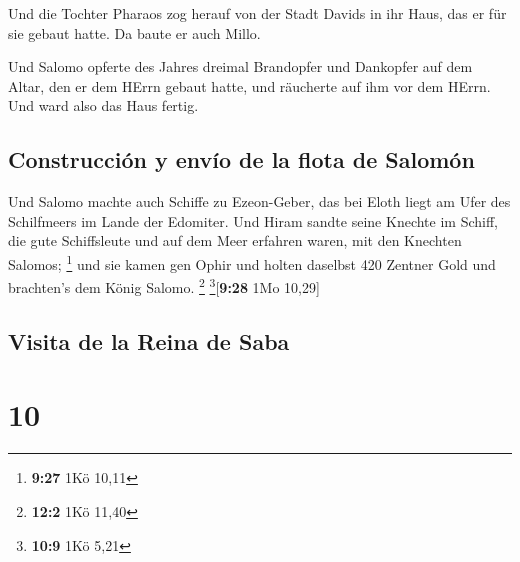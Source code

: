  Und die Tochter Pharaos zog herauf von der Stadt Davids
in ihr Haus, das er für sie gebaut hatte. Da baute er auch Millo.

 Und Salomo opferte des Jahres dreimal Brandopfer und
Dankopfer auf dem Altar, den er dem HErrn gebaut hatte, und räucherte
auf ihm vor dem HErrn. Und ward also das Haus fertig.

\hypertarget{construcciuxf3n-y-envuxedo-de-la-flota-de-salomuxf3n}{%
\subsection{Construcción y envío de la flota de
Salomón}\label{construcciuxf3n-y-envuxedo-de-la-flota-de-salomuxf3n}}

 Und Salomo machte auch Schiffe zu Ezeon-Geber, das bei
Eloth liegt am Ufer des Schilfmeers im Lande der Edomiter.
 Und Hiram sandte seine Knechte im Schiff, die gute
Schiffsleute und auf dem Meer erfahren waren, mit den Knechten Salomos;
\footnote{\textbf{9:27} 1Kö 10,11}  und sie kamen gen
Ophir und holten daselbst 420 Zentner Gold und brachten's dem König
Salomo. \footnote{\textbf{12:2} 1Kö 11,40} \footnote{\textbf{10:9} 1Kö
  5,21}{[}\textbf{9:28} 1Mo 10,29{]}

\hypertarget{visita-de-la-reina-de-saba}{%
\subsection{Visita de la Reina de
Saba}\label{visita-de-la-reina-de-saba}}

\hypertarget{section-9}{%
\section{10}\label{section-9}}

